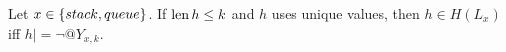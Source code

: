 \begin{theorem}
  Let $x \in {\{ stack, queue \}}$.
  If $\operatorname{len} h \le k$ and $h$ uses unique values,
  then $h \in H(L_x)$ if{f} $h |= \lnot @Y_{x,k}$.
\end{theorem}


